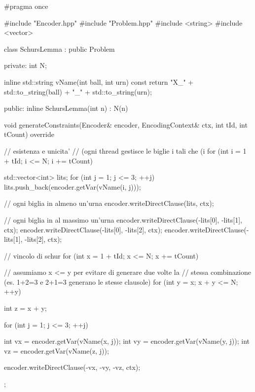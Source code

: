 \documentclass[10pt]{article}
\begin{document}
\begin{cppbox}{}
#pragma once

#include "Encoder.hpp"
#include "Problem.hpp"
#include <string>
#include <vector>

class SchursLemma : public Problem {
private:
    int N;

    inline std::string vName(int ball, int urn) const {
        return "X_" + std::to_string(ball) + "_" + std::to_string(urn);
    }

public:
    inline SchursLemma(int n) : N(n) {}

    void generateConstraints(Encoder& encoder, EncodingContext& ctx, int tId, int tCount) override {
        
        // esistenza e unicita'
        // (ogni thread gestisce le biglie i tali che (i %
        for (int i = 1 + tId; i <= N; i += tCount) {
            std::vector<int> lits;
            for (int j = 1; j <= 3; ++j) {
                lits.push_back(encoder.getVar(vName(i, j)));
            }

            // ogni biglia in almeno un'urna
            encoder.writeDirectClause(lits, ctx);

            // ogni biglia in al massimo un'urna
            encoder.writeDirectClause({-lits[0], -lits[1]}, ctx);
            encoder.writeDirectClause({-lits[0], -lits[2]}, ctx);
            encoder.writeDirectClause({-lits[1], -lits[2]}, ctx);
        }

        // vincolo di schur
        for (int x = 1 + tId; x <= N; x += tCount) {
            // assumiamo x <= y per evitare di generare due volte la
            // stessa combinazione (es. 1+2=3 e 2+1=3 generano le stesse clausole)
            for (int y = x; x + y <= N; ++y) {
                int z = x + y;
                
                for (int j = 1; j <= 3; ++j) {
                    int vx = encoder.getVar(vName(x, j));
                    int vy = encoder.getVar(vName(y, j));
                    int vz = encoder.getVar(vName(z, j));

                    encoder.writeDirectClause({-vx, -vy, -vz}, ctx);
                }
            }
        }
    }
};
\end{cppbox}
\end{document}
